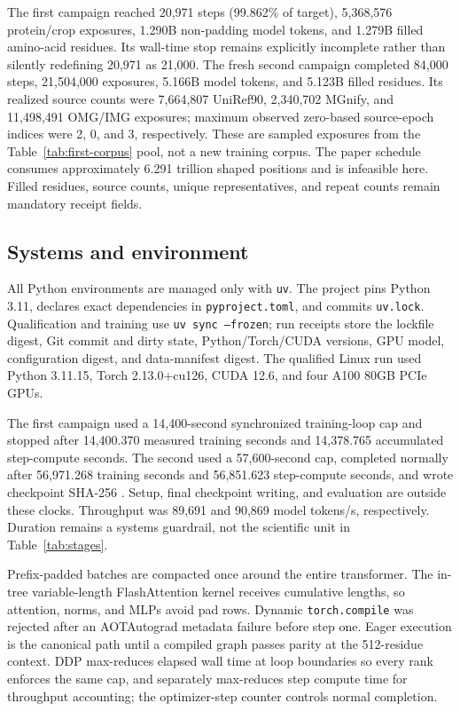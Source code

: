 \documentclass{article}
\newcommand{\code}[1]{\texttt{#1}}
\begin{document}
The first campaign reached 20,971 steps (99.862\% of target), 5,368,576
protein/crop exposures, 1.290B non-padding model tokens, and 1.279B filled
amino-acid residues. Its wall-time stop remains explicitly incomplete rather
than silently redefining 20,971 as 21,000. The fresh second campaign completed
84,000 steps, 21,504,000 exposures, 5.166B model tokens, and 5.123B filled
residues. Its realized source counts were 7,664,807 UniRef90, 2,340,702 MGnify,
and 11,498,491 OMG/IMG exposures; maximum observed zero-based source-epoch
indices were 2, 0, and 3, respectively. These are sampled exposures from the Table~\ref{tab:first-corpus}
pool, not a new training corpus. The paper schedule consumes approximately
6.291 trillion shaped positions and is infeasible here. Filled residues,
source counts, unique representatives, and repeat counts remain mandatory
receipt fields.

\subsection{Systems and environment}

All Python environments are managed only with \texttt{uv}. The project pins
Python 3.11, declares exact dependencies in \code{pyproject.toml}, and commits
\code{uv.lock}. Qualification and training use \code{uv sync --frozen}; run
receipts store the lockfile digest, Git commit and dirty state, Python/Torch/CUDA
versions, GPU model, configuration digest, and data-manifest digest. The
qualified Linux run used Python 3.11.15, Torch 2.13.0+cu126, CUDA 12.6, and four
A100 80GB PCIe GPUs.

The first campaign used a 14,400-second synchronized training-loop cap and
stopped after 14,400.370 measured training seconds and 14,378.765 accumulated
step-compute seconds. The second used a 57,600-second cap, completed normally
after 56,971.268 training seconds and 56,851.623 step-compute seconds, and
wrote checkpoint SHA-256
.
Setup, final checkpoint writing, and evaluation are outside these clocks.
Throughput was 89,691 and 90,869 model tokens/s, respectively. Duration remains
a systems guardrail, not the scientific unit in Table~\ref{tab:stages}.

Prefix-padded batches are compacted once around the entire transformer. The
in-tree variable-length FlashAttention kernel receives cumulative lengths, so
attention, norms, and MLPs avoid pad rows. Dynamic \code{torch.compile} was
rejected after an AOTAutograd metadata failure before step one. Eager execution
is the canonical path until a compiled graph passes parity at the 512-residue
context. DDP max-reduces elapsed wall time at loop boundaries so every rank
enforces the same cap, and separately max-reduces step compute time for
throughput accounting; the optimizer-step counter controls normal completion.
\end{document}
